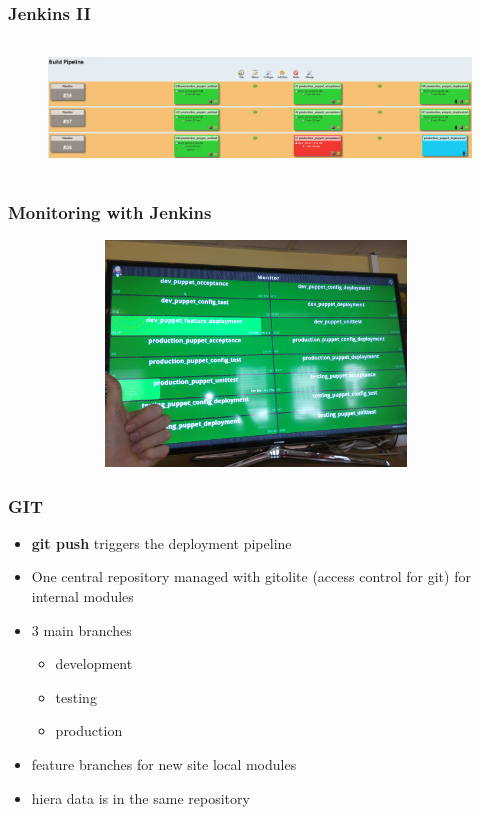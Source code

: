 \documentclass{beamer}
\begin{document}
\begin{frame}
  \frametitle{Jenkins II}
  \begin{figure}[ht]
    \centering
      \includegraphics[height=3.5cm,width=11.5cm]{../pics/jenkins_pipeline}
    \label{fig:stack}
  \end{figure}
\end{frame}


\begin{frame}
  \frametitle{Monitoring with Jenkins}
  \begin{figure}[ht]
    \centering
      \includegraphics[height=6cm,width=11cm]{../pics/jenkins_monitor_live}
    \label{fig:stack}
  \end{figure}
\end{frame}

\begin{frame}
  \frametitle{GIT}

  \begin{itemize}
  \item \textbf{git push} triggers the deployment pipeline
  \item One central repository managed with gitolite (access control
    for git) for internal modules
  \item 3 main branches
    \begin{itemize}
    \item development
    \item testing
    \item production
    \end{itemize}
  \item feature branches for new site local modules
  \item hiera data is in the same repository
  \end{itemize}
\end{frame}
\end{document}
